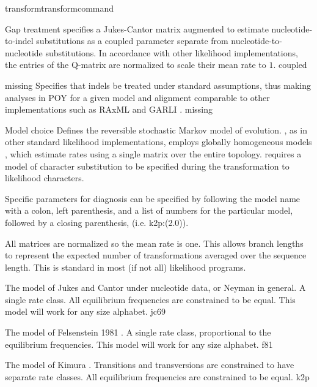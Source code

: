 \begin{command}{transform}{transformcommand}
\begin{arguments}
\begin {argumentgroup} {Gap treatment}
{specifies a Jukes-Cantor matrix augmented to
estimate nucleotide-to-indel substitutions as a
coupled parameter separate from
nucleotide-to-nucleotide substitutions. In
accordance with other likelihood implementations,
the entries of the Q-matrix are normalized
to scale their mean rate to $ 1 $.}
{coupled}

 {\obligatory missing}
{Specifies that indels be treated under standard
assumptions, thus making analyses in POY for a given
model and alignment comparable to other
implementations such as RAxML \cite{stamatakis2006} and 
GARLI \cite{zwickl2006}.}
{missing}

\end {argumentgroup}             


\begin {argumentgroup} {Model choice}
Defines the reversible stochastic Markov model of evolution.
\poy, as in other standard likelihood implementations,
employs globally homogeneous models \cite{jayaswal2005estimation}, which
estimate rates using a single matrix over the entire topology.
\poy requires a model of character substitution to be specified
during the transformation to likelihood characters.

Specific parameters for diagnosis can be specified by following
the model name with a colon, left parenthesis, and a list of
numbers for the particular model, followed by a closing
parenthesis, (i.e. k2p:(2.0)).

\begin{statement}
All matrices are normalized so the mean rate is one. This
allows branch lengths to represent the expected number of
transformations averaged over the sequence length. This is
standard in most (if not all) likelihood programs.
\end{statement}

{The model of Jukes and Cantor \cite{jukesandcantor1969}
under nucleotide data, or Neyman \cite{neyman1971} in general. A
single rate class. All equilibrium frequencies are
constrained to be equal. This model will work for any size
alphabet.}
{jc69}

{The model of Felsenstein 1981 \cite{felsenstein1981}. A
single rate class, proportional to the equilibrium
frequencies. This model will work for any size
alphabet.}
{f81}

{The model of Kimura \cite{kimura1980}. Transitions and
transversions are constrained to have separate rate
classes. All equilibrium frequencies are constrained to be
equal.}
{k2p}


\end{argumentgroup}
\end{arguments}
\end{command}
